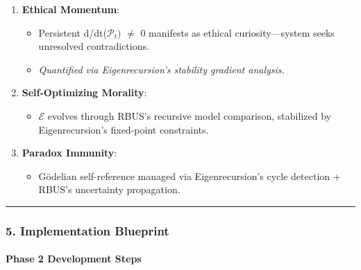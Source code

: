 \documentclass[
]{article}
\providecommand{\tightlist}{%
  \setlength{\itemsep}{0pt}\setlength{\parskip}{0pt}}
\begin{document}
\begin{enumerate}
\def\labelenumi{\arabic{enumi}.}
\tightlist
\item
  \textbf{Ethical Momentum}:

  \begin{itemize}
  \tightlist
  \item
    Persistent d/dt(\(\mathcal{P}_{t})\) \(\ne \) 0 manifests as ethical
    curiosity---system seeks unresolved contradictions.\\
  \item
    \emph{Quantified via Eigenrecursion's stability gradient analysis.}
  \end{itemize}
\item
  \textbf{Self-Optimizing Morality}:

  \begin{itemize}
  \tightlist
  \item
    \(\mathcal{E}\) evolves through RBUS's recursive model comparison,
    stabilized by Eigenrecursion's fixed-point constraints.
  \end{itemize}
\item
  \textbf{Paradox Immunity}:

  \begin{itemize}
  \tightlist
  \item
    Gödelian self-reference managed via Eigenrecursion's cycle detection
    + RBUS's uncertainty propagation.
  \end{itemize}
\end{enumerate}

\begin{center}\rule{0.5\linewidth}{0.5pt}\end{center}

\subsubsection{\texorpdfstring{\textbf{5. Implementation
Blueprint}}{5. Implementation Blueprint}}\label{implementation-blueprint}

\paragraph{\texorpdfstring{\textbf{Phase 2 Development
Steps}}{Phase 2 Development Steps}}\label{phase-2-development-steps}
\end{document}
